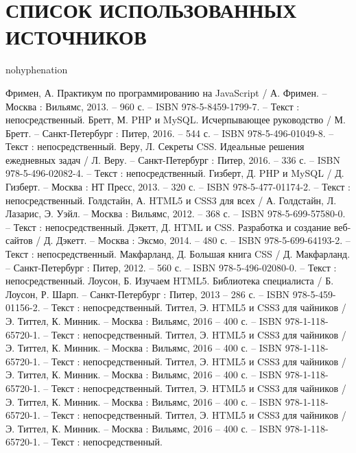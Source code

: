 \newsection
\section*{СПИСОК ИСПОЛЬЗОВАННЫХ ИСТОЧНИКОВ}

\begin{hyphenrules}{nohyphenation} %
  \begin{thebibliography}{9}

     Фримен, А. Практикум по программированию на JavaScript / А. Фримен. – Москва : Вильямс, 2013. – 960 с. – ISBN 978-5-8459-1799-7. – Текст : непосредственный.
     Бретт, М. PHP и MySQL. Исчерпывающее руководство / М. Бретт. – Санкт-Петербург : Питер, 2016. – 544 с. – ISBN 978-5-496-01049-8. – Текст : непосредственный.
     Веру, Л. Секреты CSS. Идеальные решения ежедневных задач / Л. Веру. – Санкт-Петербург : Питер, 2016. – 336 с. – ISBN 978-5-496-02082-4. – Текст : непосредственный.
    	Гизберт, Д. PHP и MySQL / Д. Гизберт. – Москва : НТ Пресс, 2013. – 320 с. – ISBN 978-5-477-01174-2. – Текст : непосредственный.
		Голдстайн, А. HTML5 и CSS3 для всех / А. Голдстайн, Л. Лазарис, Э. Уэйл. – Москва : Вильямс, 2012. – 368 с. – ISBN 978-5-699-57580-0. – Текст : непосредственный.
		Дэкетт, Д. HTML и CSS. Разработка и создание веб-сайтов / Д. Дэкетт. – Москва : Эксмо, 2014. – 480 с. – ISBN 978-5-699-64193-2. – Текст : непосредственный.
		Макфарланд, Д. Большая книга CSS / Д. Макфарланд. – Санкт-Петербург : Питер, 2012. – 560 с. – ISBN 978-5-496-02080-0. – Текст : непосредственный.
		Лоусон, Б. Изучаем HTML5. Библиотека специалиста / Б. Лоусон, Р. Шарп. – Санкт-Петербург : Питер, 2013 – 286 с. – ISBN 978-5-459-01156-2. – Текст : непосредственный.
		Титтел, Э. HTML5 и CSS3 для чайников / Э. Титтел, К. Минник. – Москва : Вильямс, 2016 – 400 с. – ISBN 978-1-118-65720-1. – Текст : непосредственный.    
		Титтел, Э. HTML5 и CSS3 для чайников / Э. Титтел, К. Минник. – Москва : Вильямс, 2016 – 400 с. – ISBN 978-1-118-65720-1. – Текст : непосредственный.    
			Титтел, Э. HTML5 и CSS3 для чайников / Э. Титтел, К. Минник. – Москва : Вильямс, 2016 – 400 с. – ISBN 978-1-118-65720-1. – Текст : непосредственный.    
				Титтел, Э. HTML5 и CSS3 для чайников / Э. Титтел, К. Минник. – Москва : Вильямс, 2016 – 400 с. – ISBN 978-1-118-65720-1. – Текст : непосредственный.    
				Титтел, Э. HTML5 и CSS3 для чайников / Э. Титтел, К. Минник. – Москва : Вильямс, 2016 – 400 с. – ISBN 978-1-118-65720-1. – Текст : непосредственный.    
  \end{thebibliography}
\end{hyphenrules}
